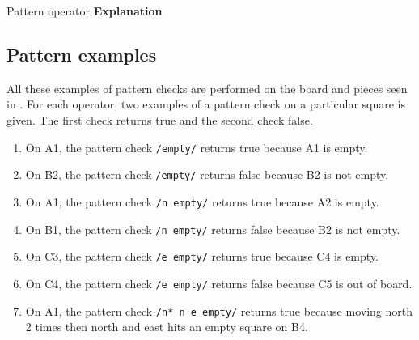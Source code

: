          {Pattern operator                       }{\textbf{Explanation}}{
}

\subsection{Pattern examples}
\label{sec:patternexamples}
All these examples of pattern checks are performed on the board and pieces seen
in . For each operator, two examples of a pattern check on
a particular square is given. The first check returns true and the second check
false.

\begin{enumerate}[noitemsep]
\item On A1, the pattern check \texttt{/empty/} returns true because A1 is empty.
\item On B2, the pattern check \texttt{/empty/} returns false because B2 is not empty.
\item On A1, the pattern check \texttt{/n empty/} returns true because A2 is empty.
\item On B1, the pattern check \texttt{/n empty/} returns false because B2 is not empty.
\item On C3, the pattern check \texttt{/e empty/} returns true because C4 is empty.
\item On C4, the pattern check \texttt{/e empty/} returns false because C5 is out of board.
\item On A1, the pattern check \texttt{/n* n e empty/} returns true because
  moving north 2 times then north and east hits an empty square on B4.
\end{enumerate}

